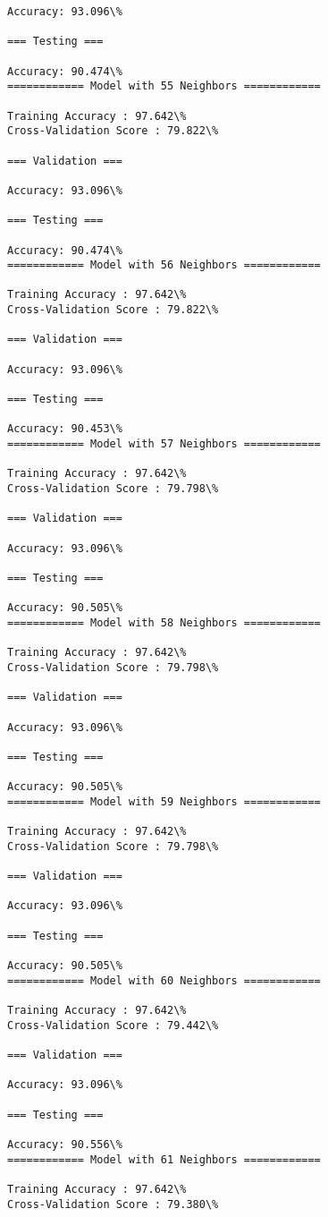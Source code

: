 \documentclass[11pt]{article}
\begin{document}
\begin{Verbatim}[commandchars=\\\{\}]
Accuracy: 93.096\%

=== Testing ===

Accuracy: 90.474\%
============ Model with 55 Neighbors ============

Training Accuracy : 97.642\%
Cross-Validation Score : 79.822\%

=== Validation ===

Accuracy: 93.096\%

=== Testing ===

Accuracy: 90.474\%
============ Model with 56 Neighbors ============

Training Accuracy : 97.642\%
Cross-Validation Score : 79.822\%

=== Validation ===

Accuracy: 93.096\%

=== Testing ===

Accuracy: 90.453\%
============ Model with 57 Neighbors ============

Training Accuracy : 97.642\%
Cross-Validation Score : 79.798\%

=== Validation ===

Accuracy: 93.096\%

=== Testing ===

Accuracy: 90.505\%
============ Model with 58 Neighbors ============

Training Accuracy : 97.642\%
Cross-Validation Score : 79.798\%

=== Validation ===

Accuracy: 93.096\%

=== Testing ===

Accuracy: 90.505\%
============ Model with 59 Neighbors ============

Training Accuracy : 97.642\%
Cross-Validation Score : 79.798\%

=== Validation ===

Accuracy: 93.096\%

=== Testing ===

Accuracy: 90.505\%
============ Model with 60 Neighbors ============

Training Accuracy : 97.642\%
Cross-Validation Score : 79.442\%

=== Validation ===

Accuracy: 93.096\%

=== Testing ===

Accuracy: 90.556\%
============ Model with 61 Neighbors ============

Training Accuracy : 97.642\%
Cross-Validation Score : 79.380\%


\end{Verbatim}
\end{document}
